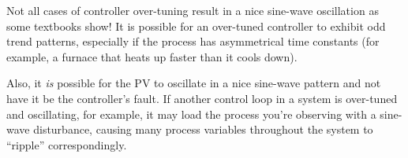 Not all cases of controller over-tuning result in a nice sine-wave oscillation as some textbooks show!  It is possible for an over-tuned controller to exhibit odd trend patterns, especially if the process has asymmetrical time constants (for example, a furnace that heats up faster than it cools down).

Also, it {\it is} possible for the PV to oscillate in a nice sine-wave pattern and not have it be the controller's fault.  If another control loop in a system is over-tuned and oscillating, for example, it may load the process you're observing with a sine-wave disturbance, causing many process variables throughout the system to ``ripple'' correspondingly.  
 



